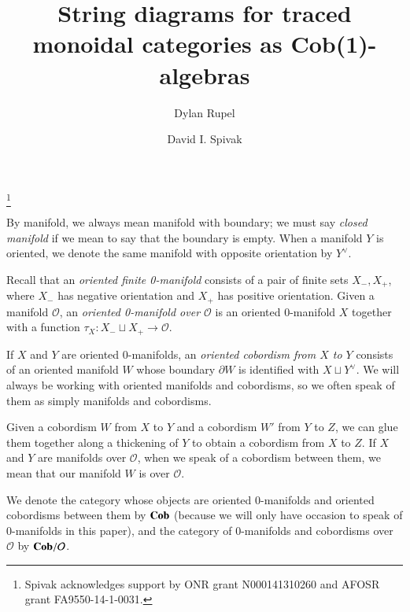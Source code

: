 \documentclass{amsart}
\def\mc{\mathcal}
\def\to{\rightarrow}
\def\taking{\colon}
\def\Cob{{\bf Cob}}
\def\mcO{\mc{O}}
\newcommand{\inp}[1]{#1_-}
\newcommand{\outp}[1]{#1_+}
\theoremstyle{remark}
\theoremstyle{definition}
\begin{document}
\title{String diagrams for traced monoidal categories as Cob(1)-algebras}

\author{Dylan Rupel}
\address{Northeastern University\\360 Huntington Ave.\\Boston, MA 02115}

\author{David I. Spivak}
\address{Massachusetts Institute of Technology\\77 Massachusetts Ave.\\Cambridge, MA 02139}

\thanks{Spivak acknowledges support by ONR grant N000141310260 and AFOSR grant FA9550-14-1-0031.}


\maketitle

\tableofcontents

By manifold, we always mean manifold with boundary; we must say {\em closed manifold} if we mean to say that the boundary is empty. When a manifold $Y$ is oriented, we denote the same manifold with opposite orientation by $Y^\vee$.

Recall that an {\em oriented finite 0-manifold} consists of a pair of finite sets $\inp{X},\outp{X}$, where $\inp{X}$ has negative orientation and $\outp{X}$ has positive orientation. Given a manifold $\mcO$, an {\em oriented 0-manifold over $\mcO$} is an oriented $0$-manifold $X$ together with a function $\tau_X\taking\inp{X}\sqcup \outp{X}\to\mcO$. 

If $X$ and $Y$ are oriented $0$-manifolds, an {\em oriented cobordism from $X$ to $Y$} consists of an oriented manifold $W$ whose boundary $\partial W$ is identified with $X\sqcup Y^\vee$. We will always be working with oriented manifolds and cobordisms, so we often speak of them as simply manifolds and cobordisms. 

Given a cobordism $W$ from $X$ to $Y$ and a cobordism $W'$ from $Y$ to $Z$, we can glue them together along a thickening of $Y$ to obtain a cobordism from $X$ to $Z$. If $X$ and $Y$ are manifolds over $\mcO$, when we speak of a cobordism between them, we mean that our manifold $W$ is over $\mcO$.

We denote the category whose objects are oriented $0$-manifolds and oriented cobordisms between them by $\Cob$ (because we will only have occasion to speak of $0$-manifolds in this paper), and the category of 0-manifolds and cobordisms over $\mcO$ by $\Cob/\mcO$.
\end{document}
